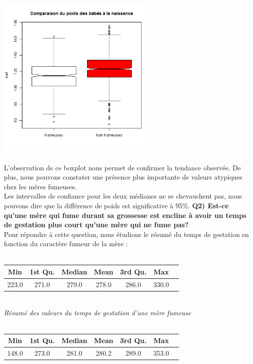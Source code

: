 ﻿\documentclass[a4paper, 9pt]{article}
\begin{document}
\includegraphics[height = 8cm, width = 8cm]{plots/boxplot_bwt_smoke.png}\\ \\
L'observation de ce boxplot nous permet de confirmer la tendance observ\'ee.
De plus, nous pouvons constater une pr\'esence plus importante de valeurs atypiques chez les m\`eres fumeuses.\\
Les intervalles de confiance pour les deux m\'edianes ne se chevauchent pas, nous pouvons
dire que la différence de poids est significative à 95\%.
\newpage
\textbf{Q2) Est-ce qu’une mère qui fume durant sa grossesse est encline à avoir un temps de gestation plus
court qu’une mère qui ne fume pas?}\\
Pour répondre à cette question, nous étudions le résumé du temps de gestation en fonction du caractère fumeur de la mère :\\ \\
\begin{tabular}{|c|c|c|c|c|c|c|}
\hline
Min & 1st Qu. & Median & Mean & 3rd Qu. & Max\\
\hline
223.0 & 271.0 & 279.0 & 278.0 & 286.0 & 330.0\\
\hline
\end{tabular}\\
\textit{R\'esum\'e des valeurs du temps de gestation d'une m\`ere fumeuse}\\ \\
\begin{tabular}{|c|c|c|c|c|c|c|}
\hline
Min & 1st Qu. & Median & Mean & 3rd Qu. & Max\\
\hline
148.0 & 273.0 & 281.0 & 280.2 & 289.0 & 353.0\\
\hline
\end{tabular}\\
\end{document}
